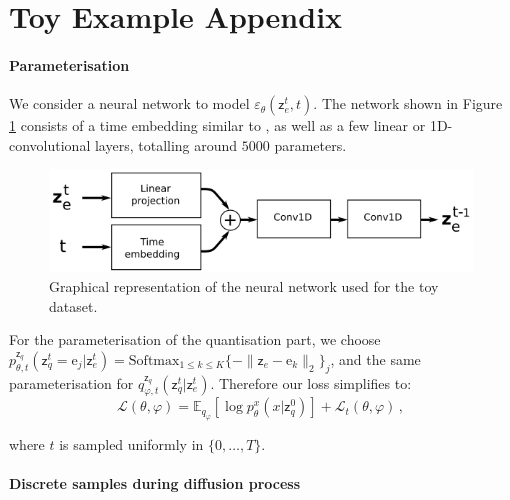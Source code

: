 \documentclass[nolayout]{article}
\theoremstyle{plain}
\theoremstyle{definition}
\theoremstyle{remark}
\newcommand{\latentcont}{\mathsf{z}_e}
\newcommand{\latentdis}{\mathsf{z}_q}
\newcommand{\rme}{\mathrm{e}}
\newcommand{\embed}{\rme}
\begin{document}
\section{Toy Example Appendix}
\label{ap:additionaltoy}

\paragraph{Parameterisation}

We consider a neural network to model  $\varepsilon_\theta(\latentcont^t ,t)$. The network shown in Figure  \ref{ap:fig:toynetwork} consists of a time embedding similar to \cite{ho2020denoising}, as well as a few linear or 1D-convolutional layers, totalling around $5000$ parameters.

\begin{figure}[h!]
    \centering
    \includegraphics[scale=2.0]{images/network_toy.png}
    \caption{Graphical representation of the neural network used for the toy dataset.}
    \label{ap:fig:toynetwork}
\end{figure}

For the parameterisation of the quantisation part, we choose $p_{\theta,t}^{\latentdis}(\latentdis^{t}=\embed_j|\latentcont^{t}) = \mathrm{Softmax}_{1\leq k \leq K}\{-\|\latentcont - \embed_k\|_2\}_j$, and the same parameterisation for $q_{\varphi,t}^{\latentdis}(\latentdis^{t}|\latentcont^{t})$. Therefore our loss simplifies to:
$$
\mathcal{L}(\theta,\varphi) = \mathbb{E}_{q_{\varphi}}\left[\log p^x_{\theta}(x|\latentdis^{0})\right] +  \mathcal{L}_t(\theta,\varphi)\,,
$$

where $t$ is sampled uniformly in $\{0,\ldots,T\}$.

\paragraph{Discrete samples during diffusion process}
\end{document}
